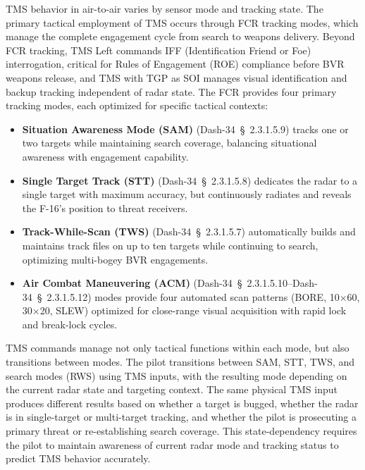 \documentclass[11pt, a4paper, twoside]{report}
\newcommand{\dashref}[1]{Dash-34~\S~#1}
\begin{document}
TMS behavior in air-to-air varies by sensor mode and tracking state. The primary tactical employment of TMS occurs through FCR tracking modes, which manage the complete engagement cycle from search to weapons delivery. Beyond FCR tracking, TMS Left commands IFF (Identification Friend or Foe) interrogation, critical for Rules of Engagement (ROE) compliance before BVR weapons release, and TMS with TGP as SOI manages visual identification and backup tracking independent of radar state. The FCR provides four primary tracking modes, each optimized for specific tactical contexts:

\begin{itemize}
    \item \textbf{Situation Awareness Mode (SAM)} (\dashref{2.3.1.5.9}) tracks one or two targets while maintaining search coverage, balancing situational awareness with engagement capability.
    
    \item \textbf{Single Target Track (STT)} (\dashref{2.3.1.5.8}) dedicates the radar to a single target with maximum accuracy, but continuously radiates and reveals the F-16's position to threat receivers.
    
    \item \textbf{Track-While-Scan (TWS)} (\dashref{2.3.1.5.7}) automatically builds and maintains track files on up to ten targets while continuing to search, optimizing multi-bogey BVR engagements.
    
    \item \textbf{Air Combat Maneuvering (ACM)} (\dashref{2.3.1.5.10}--\dashref{2.3.1.5.12}) modes provide four automated scan patterns (BORE, 10$\times$60, 30$\times$20, SLEW) optimized for close-range visual acquisition with rapid lock and break-lock cycles.
\end{itemize}

TMS commands manage not only tactical functions within each mode, but also transitions between modes. The pilot transitions between SAM, STT, TWS, and search modes (RWS) using TMS inputs, with the resulting mode depending on the current radar state and targeting context. The same physical TMS input produces different results based on whether a target is bugged, whether the radar is in single-target or multi-target tracking, and whether the pilot is prosecuting a primary threat or re-establishing search coverage. This state-dependency requires the pilot to maintain awareness of current radar mode and tracking status to predict TMS behavior accurately.
\end{document}
